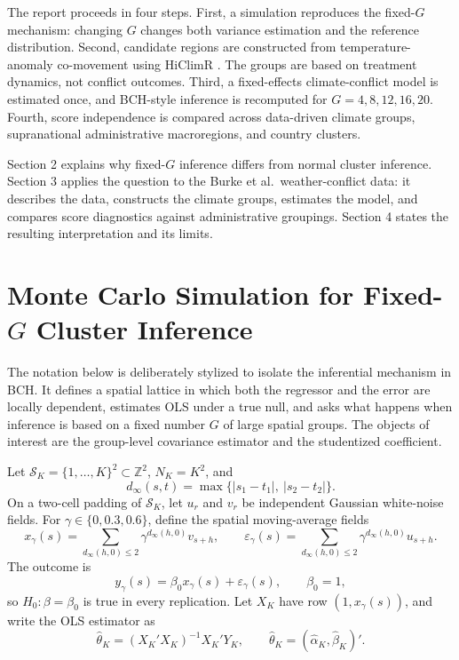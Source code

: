 \documentclass[
]{article}
\begin{document}
The report proceeds in four steps. First, a simulation reproduces the
fixed-\(G\) mechanism: changing \(G\) changes both variance estimation
and the reference distribution. Second, candidate regions are
constructed from temperature-anomaly co-movement using HiClimR
\citep{badr_zaitchik_dezfuli_2015}. The groups are based on treatment
dynamics, not conflict outcomes. Third, a fixed-effects climate-conflict
model is estimated once, and BCH-style inference is recomputed for
\(G=4,8,12,16,20\). Fourth, score independence is compared across
data-driven climate groups, supranational administrative macroregions,
and country clusters.

Section 2 explains why fixed-\(G\) inference differs from normal cluster
inference. Section 3 applies the question to the Burke et
al.~weather-conflict data: it describes the data, constructs the climate
groups, estimates the model, and compares score diagnostics against
administrative groupings. Section 4 states the resulting interpretation
and its limits.

\section{Monte Carlo Simulation for \texorpdfstring{Fixed-\(G\)}{Fixed-G} Cluster Inference}

The notation below is deliberately stylized to isolate the inferential
mechanism in BCH. It defines a spatial lattice in which both the
regressor and the error are locally dependent, estimates OLS under a
true null, and asks what happens when inference is based on a fixed
number \(G\) of large spatial groups. The objects of interest are the
group-level covariance estimator and the studentized coefficient.

Let \(\mathcal S_K=\{1,\ldots,K\}^2\subset\mathbb Z^2\), \(N_K=K^2\),
and \[
d_\infty(s,t)=\max\{|s_1-t_1|,\ |s_2-t_2|\}.
\] On a two-cell padding of \(\mathcal S_K\), let \(u_r\) and \(v_r\) be
independent Gaussian white-noise fields. For \(\gamma\in\{0,0.3,0.6\}\),
define the spatial moving-average fields \[
x_\gamma(s)=\sum_{d_\infty(h,0)\leq 2}\gamma^{d_\infty(h,0)}v_{s+h},
\qquad
\varepsilon_\gamma(s)=\sum_{d_\infty(h,0)\leq 2}\gamma^{d_\infty(h,0)}u_{s+h}.
\] The outcome is \[
y_\gamma(s)=\beta_0x_\gamma(s)+\varepsilon_\gamma(s),\qquad \beta_0=1,
\] so \(H_0:\beta=\beta_0\) is true in every replication. Let \(X_K\)
have row \((1,x_\gamma(s))\), and write the OLS estimator as \[
\widehat\theta_K=(X_K'X_K)^{-1}X_K'Y_K,\qquad
\widehat\theta_K=(\widehat\alpha_K,\widehat\beta_K)'.
\]
\end{document}
